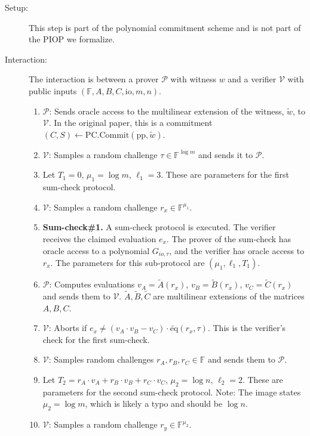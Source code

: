 \begin{description}
    \item[Setup:] This step is part of the polynomial commitment scheme and is not part of the PIOP we formalize.
    \item[Interaction:] The interaction is between a prover $\mathcal{P}$ with witness $w$ and a verifier $\mathcal{V}$ with public inputs $(\mathbb{F}, A, B, C, \text{io}, m, n)$.
    \begin{enumerate}
        \item $\mathcal{P}$: Sends oracle access to the multilinear extension of the witness, $\tilde{w}$, to $\mathcal{V}$. In the original paper, this is a commitment $(C,S) \leftarrow \text{PC.Commit}(\text{pp}, \tilde{w})$.
        \item $\mathcal{V}$: Samples a random challenge $\tau \in \mathbb{F}^{\log m}$ and sends it to $\mathcal{P}$.
        \item Let $T_1 = 0$, $\mu_1 = \log m$, $\ell_1 = 3$. These are parameters for the first sum-check protocol.
        \item $\mathcal{V}$: Samples a random challenge $r_x \in \mathbb{F}^{\mu_1}$.
        \item \textbf{Sum-check\#1.} A sum-check protocol is executed. The verifier receives the claimed evaluation $e_x$. The prover of the sum-check has oracle access to a polynomial $G_{io, \tau}$, and the verifier has oracle access to $r_x$. The parameters for this sub-protocol are $(\mu_1, \ell_1, T_1)$.
        \item $\mathcal{P}$: Computes evaluations $v_A = \tilde{A}(r_x)$, $v_B = \tilde{B}(r_x)$, $v_C = \tilde{C}(r_x)$ and sends them to $\mathcal{V}$. $\tilde{A}, \tilde{B}, \tilde{C}$ are multilinear extensions of the matrices $A, B, C$.
        \item $\mathcal{V}$: Aborts if $e_x \neq (v_A \cdot v_B - v_C) \cdot \tilde{\text{eq}}(r_x, \tau)$. This is the verifier's check for the first sum-check.
        \item $\mathcal{V}$: Samples random challenges $r_A, r_B, r_C \in \mathbb{F}$ and sends them to $\mathcal{P}$.
        \item Let $T_2 = r_A \cdot v_A + r_B \cdot v_B + r_C \cdot v_C$, $\mu_2 = \log n$, $\ell_2 = 2$. These are parameters for the second sum-check protocol. Note: The image states $\mu_2 = \log m$, which is likely a typo and should be $\log n$.
        \item $\mathcal{V}$: Samples a random challenge $r_y \in \mathbb{F}^{\mu_2}$.

\end{enumerate}
\end{description}
